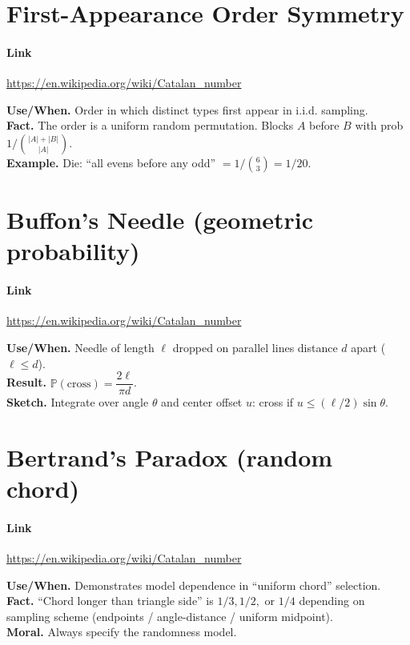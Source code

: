 \documentclass[11pt,A4,twoside]{article}
\let\oldsection\section
\renewcommand{\section}{\FloatBarrier\oldsection}
\numberwithin{equation}{section}
\theoremstyle{definition}
\theoremstyle{remark}
\newcommand{\Prob}{\mathbb{P}}
\newcommand{\Binom}[2]{\binom{#1}{#2}}
\begin{document}
\section{First-Appearance Order Symmetry}
\paragraph{Link} \url{https://en.wikipedia.org/wiki/Catalan_number}

\textbf{Use/When.} Order in which distinct types first appear in i.i.d. sampling.\\
\textbf{Fact.} The order is a uniform random permutation. Blocks \(A\) before \(B\) with prob \(1/\Binom{|A|+|B|}{|A|}\).\\
\textbf{Example.} Die: “all evens before any odd” \(=1/\Binom{6}{3}=1/20\).

\section{Buffon’s Needle (geometric probability)}
\paragraph{Link} \url{https://en.wikipedia.org/wiki/Catalan_number}

\textbf{Use/When.} Needle of length \(\ell\) dropped on parallel lines distance \(d\) apart (\(\ell\le d\)).\\
\textbf{Result.} \(\Prob(\text{cross})=\dfrac{2\ell}{\pi d}\).\\
\textbf{Sketch.} Integrate over angle \(\theta\) and center offset \(u\): cross if \(u\le (\ell/2)\sin\theta\).

\section{Bertrand’s Paradox (random chord)}
\paragraph{Link} \url{https://en.wikipedia.org/wiki/Catalan_number}

\textbf{Use/When.} Demonstrates model dependence in “uniform chord” selection.\\
\textbf{Fact.} “Chord longer than triangle side” is \(1/3,1/2,\) or \(1/4\) depending on sampling scheme (endpoints / angle-distance / uniform midpoint).\\
\textbf{Moral.} Always specify the randomness model.
\end{document}
